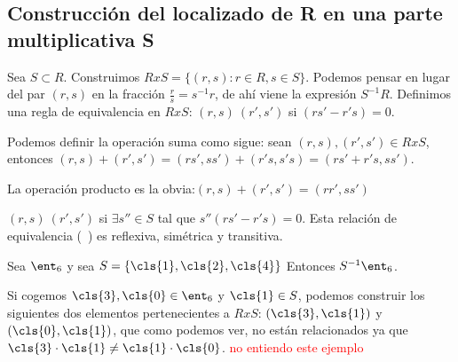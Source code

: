\subsection{Construcción del localizado de R en una parte multiplicativa S}
Sea $S \subset R$. Construimos $RxS=\{ (r,s): r \in R, s\in S \}$. Podemos pensar en lugar del par $(r,s)$ en la fracción $\frac{r}{s}=s^{-1}r$, de ahí viene la expresión $S^{-1}R$. Definimos una regla de equivalencia en $RxS$: $(r,s)~(r',s')$ si  $(rs'-r's)=0$.

Podemos definir la operación suma como sigue: sean $(r,s), (r',s')\in RxS$, entonces $(r,s)+(r',s')=(rs',ss')+(r's,s's)=(rs'+r's,ss')$.

La operación producto es la obvia:$(r,s)+(r',s')=(rr',ss')$

$(r,s)~(r',s')$ si $\exists s'' \in S$ tal que $s''(rs'-r's)=0$. Esta relación de equivalencia (~) es reflexiva, simétrica y transitiva.

\begin{example}
	Sea $\ent_6$ y sea $S=\{ \cls{1},\cls{2},\cls{4} \}$
	Entonces $S^{-1}\ent_6$.
	
	Si cogemos $\cls{3},\cls{0} \in \ent_6$ y $\cls{1}\in S$, podemos construir los siguientes dos elementos pertenecientes a $RxS$: $(\cls{3},\cls{1})$ y $(\cls{0},\cls{1})$, que como podemos ver, no están relacionados ya que $\cls{3}\cdot\cls{1}\neq \cls{1}\cdot\cls{0}$.
	\textcolor{red}{no entiendo este ejemplo}
\end{example}

